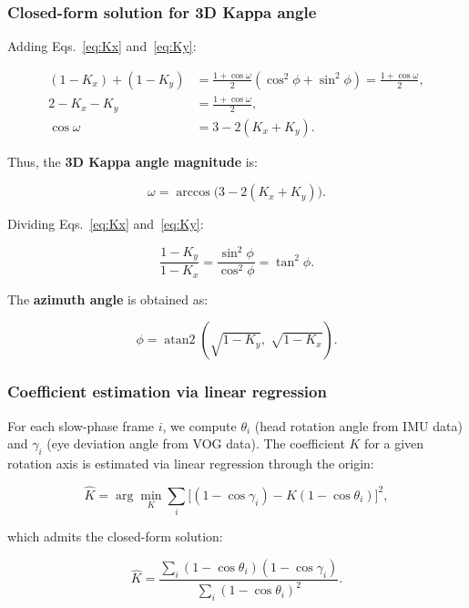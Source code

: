 \documentclass[review,numbers,sort&compress]{elsarticle}
\begin{document}
\subsubsection{Closed-form solution for 3D Kappa angle}

Adding Eqs.~\ref{eq:Kx} and~\ref{eq:Ky}:

\begin{align}
(1-K_x) + (1-K_y) &= \frac{1+\cos\omega}{2}(\cos^2\phi + \sin^2\phi) = \frac{1+\cos\omega}{2}, \\
2 - K_x - K_y &= \frac{1+\cos\omega}{2}, \\
\cos\omega &= 3 - 2(K_x + K_y).
\end{align}

Thus, the \textbf{3D Kappa angle magnitude} is:

\begin{equation}
\boxed{\omega = \arccos\bigl(3 - 2(K_x + K_y)\bigr)}.
\label{eq:omega}
\end{equation}

Dividing Eqs.~\ref{eq:Kx} and~\ref{eq:Ky}:

\begin{equation}
\frac{1-K_y}{1-K_x} = \frac{\sin^2\phi}{\cos^2\phi} = \tan^2\phi.
\end{equation}

The \textbf{azimuth angle} is obtained as:

\begin{equation}
\boxed{\phi = \operatorname{atan2}\left(\sqrt{1-K_y},\;\sqrt{1-K_x}\right)}.
\label{eq:phi}
\end{equation}

\subsubsection{Coefficient estimation via linear regression}

For each slow-phase frame $i$, we compute $\theta_i$ (head rotation angle from IMU data) and $\gamma_i$ (eye deviation angle from VOG data). The coefficient $K$ for a given rotation axis is estimated via linear regression through the origin:

\begin{equation}
\hat{K} = \arg\min_{K} \sum_{i} \bigl[(1-\cos\gamma_i) - K(1-\cos\theta_i)\bigr]^2,
\end{equation}

which admits the closed-form solution:

\begin{equation}
\hat{K} = \frac{\sum_i (1-\cos\theta_i)(1-\cos\gamma_i)}{\sum_i (1-\cos\theta_i)^2}.
\end{equation}
\end{document}
